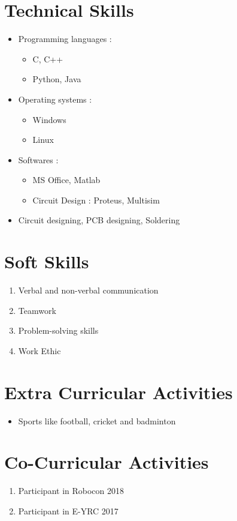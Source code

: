\documentclass[margin,line]{res}
\begin{document}
\begin{resume}
\section{\sc Technical Skills}
\begin{itemize}
	\item Programming languages : 
	\begin{itemize}
		\item C, C++
		\item Python, Java
	\end{itemize}
	\item Operating systems : 
	\begin{itemize}
		\item Windows
		\item Linux
	\end{itemize}
	\item Softwares :
	\begin{itemize}
		 \item MS Office, Matlab
		\item Circuit Design : Proteus, Multisim
	\end{itemize}
	\item Circuit designing, PCB designing, Soldering
\end{itemize}

\section{\sc Soft Skills}
\begin{enumerate}
	\item Verbal and non-verbal communication
	\item Teamwork
	\item Problem-solving skills
	\item Work Ethic
\end{enumerate}

\section{\sc Extra Curricular Activities}
\begin{itemize}
	\item Sports like football, cricket and badminton
\end{itemize}

\section{\sc Co-Curricular Activities}
\begin{enumerate}
	\item Participant in Robocon 2018 
	\item Participant in E-YRC 2017
\end{enumerate}


\end{resume}
\end{document}

